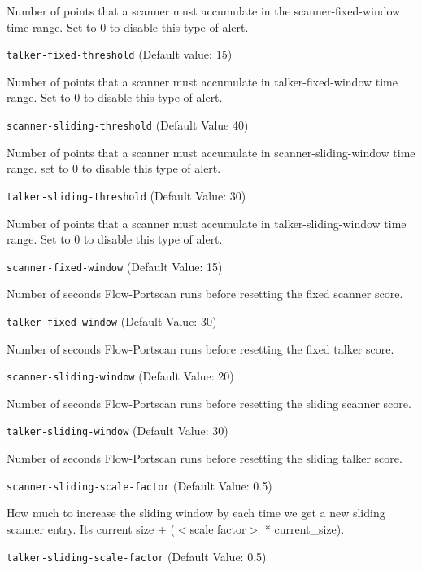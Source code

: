 \documentclass[english]{report}
\newcounter{slistnum}
\newenvironment{slist}
{ \begin{list}{ {\bf \arabic{slistnum}.} }{\usecounter{slistnum} } }
{ \end{list} }
\begin{document}
\begin{slist}
Number of points that a scanner must accumulate in the scanner-fixed-window
time range.  Set to 0 to disable this type of alert. 

\item \texttt{talker-fixed-threshold} (Default value: 15)

Number of points that a scanner must accumulate in talker-fixed-window time
range. Set to 0 to disable this type of alert. 

\item \texttt{scanner-sliding-threshold} (Default Value 40)

Number of points that a scanner must accumulate in scanner-sliding-window time
range. set to 0 to disable this type of alert.

\item \texttt{talker-sliding-threshold} (Default Value: 30)

Number of points that a scanner must accumulate in talker-sliding-window time
range. Set to 0 to disable this type of alert. 

\item \texttt{scanner-fixed-window} (Default Value: 15)

Number of seconds Flow-Portscan runs before resetting the fixed scanner score. 

\item \texttt{talker-fixed-window} (Default Value: 30)

Number of seconds Flow-Portscan runs before resetting the fixed talker score. 

\item \texttt{scanner-sliding-window} (Default Value: 20)

Number of seconds Flow-Portscan runs before resetting the sliding scanner score. 

\item \texttt{talker-sliding-window} (Default Value: 30)

Number of seconds Flow-Portscan runs before resetting the sliding talker score. 

\item \texttt{scanner-sliding-scale-factor} (Default Value: 0.5)

How much to increase the sliding window by each time we get a new sliding
scanner entry.  Its current size + ($<$scale factor$>$ * current\_size). 

\item \texttt{talker-sliding-scale-factor} (Default Value: 0.5)


\end{slist}
\end{document}

